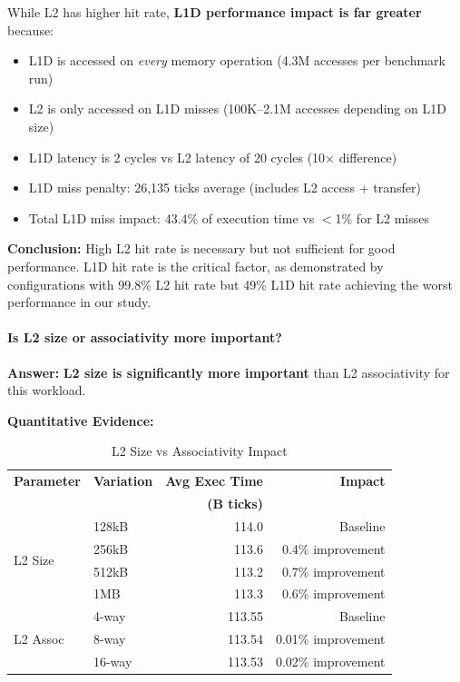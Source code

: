 \documentclass[11pt,a4paper]{article}
\begin{document}
While L2 has higher hit rate, \textbf{L1D performance impact is far greater} because:
\begin{itemize}[noitemsep]
    \item L1D is accessed on \textit{every} memory operation (4.3M accesses per benchmark run)
    \item L2 is only accessed on L1D misses (100K--2.1M accesses depending on L1D size)
    \item L1D latency is 2 cycles vs L2 latency of 20 cycles (10× difference)
    \item L1D miss penalty: 26,135 ticks average (includes L2 access + transfer)
    \item Total L1D miss impact: 43.4\% of execution time vs $<$1\% for L2 misses
\end{itemize}

\textbf{Conclusion:} High L2 hit rate is necessary but not sufficient for good performance. L1D hit rate is the critical factor, as demonstrated by configurations with 99.8\% L2 hit rate but 49\% L1D hit rate achieving the worst performance in our study.

\paragraph{Is L2 size or associativity more important?}

\textbf{Answer:} \textbf{L2 size is significantly more important} than L2 associativity for this workload.

\textbf{Quantitative Evidence:}

\begin{table}[H]
\centering
\caption{L2 Size vs Associativity Impact}
\begin{tabular}{llrr}
\toprule
\textbf{Parameter} & \textbf{Variation} & \textbf{Avg Exec Time} & \textbf{Impact} \\
 &  & \textbf{(B ticks)} & \\
\midrule
\multirow{4}{*}{L2 Size} & 128kB & 114.0 & Baseline \\
 & 256kB & 113.6 & 0.4\% improvement \\
 & 512kB & 113.2 & 0.7\% improvement \\
 & 1MB & 113.3 & 0.6\% improvement \\
\midrule
\multirow{3}{*}{L2 Assoc} & 4-way & 113.55 & Baseline \\
 & 8-way & 113.54 & 0.01\% improvement \\
 & 16-way & 113.53 & 0.02\% improvement \\
\bottomrule
\end{tabular}
\end{table}
\end{document}
